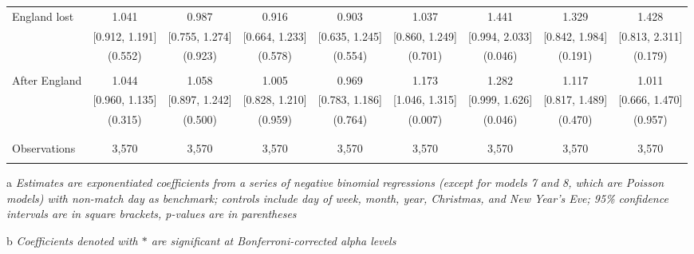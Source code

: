 \documentclass[12pt, a4paper]{article}
\begin{document}
\begin{table}
\begin{threeparttable}
\begin{tabular}{@{\extracolsep{1pt}}lcccccccc}
 England lost & 1.041 & 0.987 & 0.916 & 0.903 & 1.037 & 1.441 & 1.329 & 1.428 \\
  & [0.912, 1.191] & [0.755, 1.274] & [0.664, 1.233] & [0.635, 1.245] & [0.860, 1.249] & [0.994, 2.033] & [0.842, 1.984] & [0.813, 2.311] \\
  & (0.552) & (0.923) & (0.578) & (0.554) & (0.701) & (0.046) & (0.191) & (0.179) \\
  & & & & & & & & \\
 After England & 1.044 & 1.058 & 1.005 & 0.969 & 1.173 & 1.282 & 1.117 & 1.011 \\
  & [0.960, 1.135] & [0.897, 1.242] & [0.828, 1.210] & [0.783, 1.186] & [1.046, 1.315] & [0.999, 1.626] & [0.817, 1.489] & [0.666, 1.470] \\
  & (0.315) & (0.500) & (0.959) & (0.764) & (0.007) & (0.046) & (0.470) & (0.957) \\
  & & & & & & & & \\
\hline \\[-1.8ex]
Observations & 3,570 & 3,570 & 3,570 & 3,570 & 3,570 & 3,570 & 3,570 & 3,570 \\
\hline
\hline \\[-1.8ex]
\end{tabular}
\begin{tablenotes}
      \item[a] \textit{Estimates are exponentiated coefficients from a series of negative binomial regressions (except for models 7 and 8, which are Poisson models) with non-match day as benchmark; controls include day of week, month, year, Christmas, and New Year's Eve; 95\% confidence intervals are in square brackets, p-values are in parentheses}
             \item[b] \textit{Coefficients denoted with $*$ are significant at Bonferroni-corrected alpha levels}
    \end{tablenotes}
\end{threeparttable}
\end{table}
\end{document}
